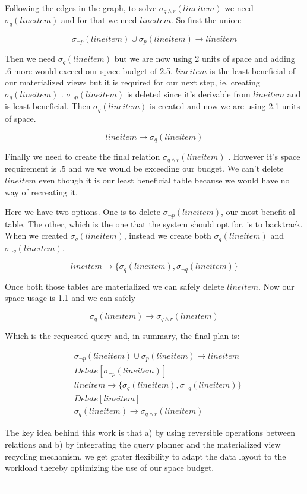 Following the edges in the graph, to solve \(\sigma_{q \land
  r}(lineitem)\) we need \(\sigma_{q}(lineitem)\) and for that we need
\(lineitem\). So first the union:

\[
  \sigma_{\neg p}(lineitem) \cup \sigma_{p}(lineitem) \rightarrow lineitem
\]

Then we need \(\sigma_{q}(lineitem)\) but we are now using 2 units of
space and adding .6 more would exceed our space budget of
2.5. \(lineitem\) is the least beneficial of our materialized views
but it is required for our next step, ie. creating
\(\sigma_{q}(lineitem)\) . \(\sigma_{\neg p}(lineitem)\) is deleted
since it's derivable from \(lineitem\) and is least beneficial. Then
\(\sigma_{q}(lineitem)\) is created and now we are using 2.1 units of
space.

\[
  lineitem \rightarrow \sigma_{q}(lineitem)
\]

Finally we need to create the final relation \(\sigma_{q \land
  r}(lineitem)\) . However it's space requirement is .5 and we we would
be exceeding our budget. We can't delete \(lineitem\) even though it
is our least beneficial table because we would have no way of
recreating it.

Here we have two options. One is to delete \(\sigma_{\neg
  p}(lineitem)\), our most benefit al table. The other, which is the one
that the system should opt for, is to backtrack. When we created
\(\sigma_{q}(lineitem)\), instead we create both
\(\sigma_{q}(lineitem)\) and \(\sigma_{\neg q}(lineitem)\).

\[
  lineitem \rightarrow \{\sigma_{q}(lineitem), \sigma_{\neg q}(lineitem)\}
\]

Once both those tables are materialized we can safely delete
\(lineitem\). Now our space usage is 1.1 and we can safely

\[
  \sigma_{q}(lineitem) \rightarrow \sigma_{q \land r} (lineitem)
\]

Which is the requested query and, in summary, the final plan is:

\begin{align*}
  &\sigma_{\neg p}(lineitem) \cup \sigma_{p}(lineitem) \rightarrow lineitem \\
  &Delete[\sigma_{\neg p}(lineitem)] \\
  &lineitem \rightarrow \{\sigma_{q}(lineitem), \sigma_{\neg q}(lineitem)\} \\
  &Delete[lineitem] \\
  &\sigma_{q}(lineitem) \rightarrow \sigma_{q \land r} (lineitem)
\end{align*}

The key idea behind this work is that a) by using reversible
operations between relations and b) by integrating the query planner
and the materialized view recycling mechanism, we get grater
flexibility to adapt the data layout to the workload thereby
optimizing the use of our space budget.

-
